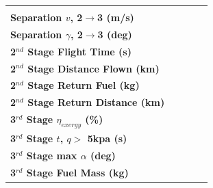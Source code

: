 \begin{tabular}{l c c c c}
	& \secondthirdSeparationAltMaxTGroundMaxTStrat
	\\
	\textbf{Separation $v$, 2$\rightarrow$3 (m/s)}
	& \secondthirdSeparationvMinTGroundMinTStrat
	& \secondthirdSeparationvMaxTGroundMinTStrat
	& \secondthirdSeparationvMinTGroundMaxTStrat
	& \secondthirdSeparationvMaxTGroundMaxTStrat
	\\
	\textbf{Separation $\gamma$, 2$\rightarrow$3 (deg)}
	& \secondthirdSeparationgammaMinTGroundMinTStrat
	& \secondthirdSeparationgammaMaxTGroundMinTStrat
	& \secondthirdSeparationgammaMinTGroundMaxTStrat
	& \secondthirdSeparationgammaMaxTGroundMaxTStrat
	\\
	\textbf{2$^{nd}$ Stage Flight Time (s)}
	& \secondFlightTimeMinTGroundMinTStrat
	& \secondFlightTimeMaxTGroundMinTStrat
	& \secondFlightTimeMinTGroundMaxTStrat
	& \secondFlightTimeMaxTGroundMaxTStrat
	\\
	\textbf{2$^{nd}$ Stage Distance Flown (km)}
	& \SecondDistMinTGroundMinTStrat
	& \SecondDistMaxTGroundMinTStrat
	& \SecondDistMinTGroundMaxTStrat
	& \SecondDistMaxTGroundMaxTStrat
	\\
	\textbf{2$^{nd}$ Stage Return Fuel (kg)}
	& \returnFuelMinTGroundMinTStrat
	& \returnFuelMaxTGroundMinTStrat
	& \returnFuelMinTGroundMaxTStrat
	& \returnFuelMaxTGroundMaxTStrat
	\\
	\textbf{2$^{nd}$ Stage Return Distance (km)}
	& \returnDistMinTGroundMinTStrat
	& \returnDistMaxTGroundMinTStrat
	& \returnDistMinTGroundMaxTStrat
	& \returnDistMaxTGroundMaxTStrat
	\\
	\hline 
	\textbf{3$^{rd}$ Stage $\eta_{exergy}$ (\%)}
	& \textbf{\thirddExergyEffMinTGroundMinTStrat}
	& \textbf{\thirddExergyEffMaxTGroundMinTStrat}
	& \textbf{\thirddExergyEffMinTGroundMaxTStrat}
	& \textbf{\thirddExergyEffMaxTGroundMaxTStrat}
	\\
	\textbf{3$^{rd}$ Stage $t$, $q >$ 5kpa (s)}
	& \thirdqOverFiveMinTGroundMinTStrat
	& \thirdqOverFiveMaxTGroundMinTStrat
	& \thirdqOverFiveMinTGroundMaxTStrat
	& \thirdqOverFiveMaxTGroundMaxTStrat
	\\
	\textbf{3$^{rd}$ Stage max $\alpha$ (deg)}
	& \thirdmaxAoAMinTGroundMinTStrat
	& \thirdmaxAoAMaxTGroundMinTStrat
	& \thirdmaxAoAMinTGroundMaxTStrat
	& \thirdmaxAoAMaxTGroundMaxTStrat
	\\
	\textbf{3$^{rd}$ Stage Fuel Mass (kg)}
	& \thirdmFuelMinTGroundMinTStrat
	& \thirdmFuelMaxTGroundMinTStrat
	& \thirdmFuelMinTGroundMaxTStrat
	& \thirdmFuelMaxTGroundMaxTStrat
	\\
	\hline 
\end{tabular} 



